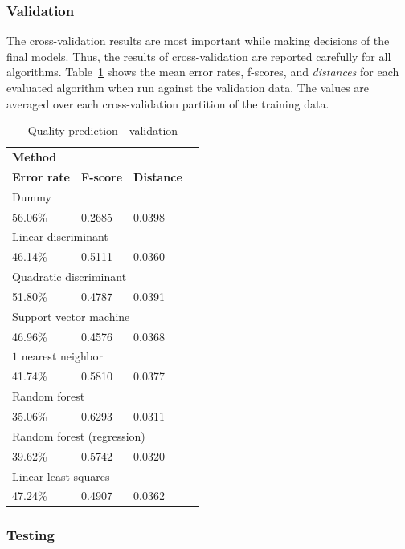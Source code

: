 \documentclass[twoside]{article}
\begin{document}
\begin{multicols}{2}
\subsubsection{Validation}

The cross-validation results are most important while making decisions of the final models. Thus, the results of cross-validation are reported carefully for all algorithms.
Table~\ref{table:quality_validation} shows the mean error rates, f-scores, and \emph{distances} for each evaluated algorithm when run against the validation data. The values are averaged over each
cross-validation partition of the training data.

\begin{table}[H]
\caption{Quality prediction - validation}
\label{table:quality_validation}
\centering
\begin{tabular}{llll}
\multicolumn{3}{l}{\textbf{Method}} \\
\textbf{Error rate} & \textbf{F-score} & \textbf{Distance} \\
\midrule
\multicolumn{3}{l}{Dummy} \\
56.06\% & 0.2685 & 0.0398 \\
\multicolumn{3}{l}{Linear discriminant} \\
46.14\% & 0.5111 & 0.0360 \\
\multicolumn{3}{l}{Quadratic discriminant} \\
51.80\% & 0.4787 & 0.0391 \\
\multicolumn{3}{l}{Support vector machine} \\
46.96\% & 0.4576 & 0.0368 \\
\multicolumn{3}{l}{$1$ nearest neighbor} \\
41.74\% & 0.5810 & 0.0377 \\
\multicolumn{3}{l}{Random forest} \\
35.06\% & 0.6293 & 0.0311 \\
\multicolumn{3}{l}{Random forest (regression)} \\
39.62\% & 0.5742 & 0.0320 \\
\multicolumn{3}{l}{Linear least squares} \\
47.24\% & 0.4907 & 0.0362 \\
\end{tabular}
\end{table}

\subsubsection{Testing}


\end{multicols}
\end{document}
